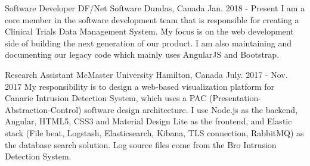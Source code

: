 

\begin{cventries}

  \cventry
{Software Developer} %
{DF/Net Software} %
{Dundas, Canada} %
{Jan. 2018 - Present} %
{I am a core member in the software development team that is responsible for creating a Clinical Trials Data Management System. My focus is on the web development side of building the next generation of our product. I am also maintaining and documenting our legacy code which mainly uses AngularJS and Bootstrap. 
}

  \cventry
{Research Assistant} %
{McMaster University} %
{Hamilton, Canada} %
{July. 2017 - Nov. 2017} %
{My responsibility is to design a web-based visualization platform for Canarie Intrusion Detection System, which uses a PAC (Presentation-Abstraction-Control) software design architecture. I use Node.js as the backend, Angular, HTML5, CSS3 and Material Design Lite as the frontend, and Elastic stack (File beat, Logstash, Elasticsearch, Kibana, TLS connection, RabbitMQ) as the database search solution. Log source files come from the Bro Intrusion Detection System. 
}


\end{cventries}
